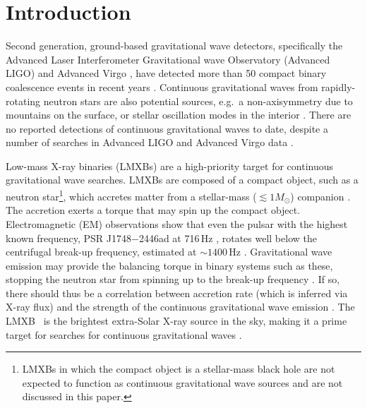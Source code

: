 \section{\label{sec:amxp_intro}Introduction} 
Second generation, ground-based gravitational wave detectors, specifically the Advanced Laser Interferometer Gravitational wave Observatory (Advanced LIGO) \cite{aligo2015} and Advanced Virgo \cite{avirgo2014}, have detected more than 50 compact binary coalescence events in recent years \cite{gwtc1, gwtc2, gwtc2.1}. Continuous gravitational waves from rapidly-rotating neutron stars are also potential sources, e.g.~a non-axisymmetry due to mountains on the surface, or stellar oscillation modes in the interior \cite{Glampedakis2018, Sieniawska2019, Haskell2021}. There are no reported detections of continuous gravitational waves to date, despite a number of searches in Advanced LIGO and Advanced Virgo data \cite{cw170817, o2narrow, o2vitsco, Middleton2020, Papa2020, Fesik2020, Fesik2020a, Piccinni2020, Steltner2021, Zhang2021, Beniwal2021, Jones2021, o3aknown, Dergachev2021a, Rajbhandari2021, o3abinaryallsky, Wette2021, o30537_2f, o30537_rmodes, o3aAllSkyIso, o3aSNR, Ashok2021}.

Low-mass X-ray binaries (LMXBs) are a high-priority target for continuous gravitational wave searches. LMXBs are composed of a compact object, such as a neutron star\footnote{LMXBs in which the compact object is a stellar-mass black hole are not expected to function as continuous gravitational wave sources and are not discussed in this paper.}, which accretes matter from a stellar-mass ($\lesssim 1 M_\odot$) companion \cite{Patruno2021}. The accretion exerts a torque that may spin up the compact object. Electromagnetic (EM) observations show that even the pulsar with the highest known frequency, PSR J1748$-$2446ad at 716\,Hz \cite{Hessels2006}, rotates well below the centrifugal break-up frequency, estimated at $\sim1400\,$Hz \cite{Cook1994}. Gravitational wave emission may provide the balancing torque in binary systems such as these, stopping the neutron star from spinning up to the break-up frequency \cite{Bildsten1998, Andersson1999a}. If so, there should thus be a correlation between accretion rate (which is inferred via X-ray flux) and the strength of the continuous gravitational wave emission \cite{Papaloizou1978, Wagoner1984, Bildsten1998, Andersson1999a}. The LMXB \sco\ is the brightest extra-Solar X-ray source in the sky, making it a prime target for searches for continuous gravitational waves \cite{o1vitsco, o1crosscorSco, o2vitsco, Zhang2021}. 

